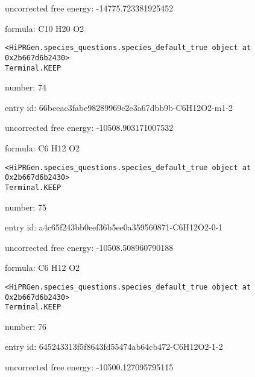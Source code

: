 \documentclass{article}
\begin{document}
uncorrected free energy: -14775.723381925452



formula: C10 H20 O2


\vspace{1cm}
\begin{verbatim}
<HiPRGen.species_questions.species_default_true object at 0x2b667d6b2430>
Terminal.KEEP
\end{verbatim}


number: 74



entry id: 66beeac3fabe98289969e2e3a67dbb9b-C6H12O2-m1-2



uncorrected free energy: -10508.903171007532



formula: C6 H12 O2


\vspace{1cm}
\begin{verbatim}
<HiPRGen.species_questions.species_default_true object at 0x2b667d6b2430>
Terminal.KEEP
\end{verbatim}


number: 75



entry id: a4c65f243bb0eef36b5ee0a359560871-C6H12O2-0-1



uncorrected free energy: -10508.508960790188



formula: C6 H12 O2


\vspace{1cm}
\begin{verbatim}
<HiPRGen.species_questions.species_default_true object at 0x2b667d6b2430>
Terminal.KEEP
\end{verbatim}


number: 76



entry id: 645243313f5f8643fd55474ab64cb472-C6H12O2-1-2



uncorrected free energy: -10500.127095795115
\end{document}
